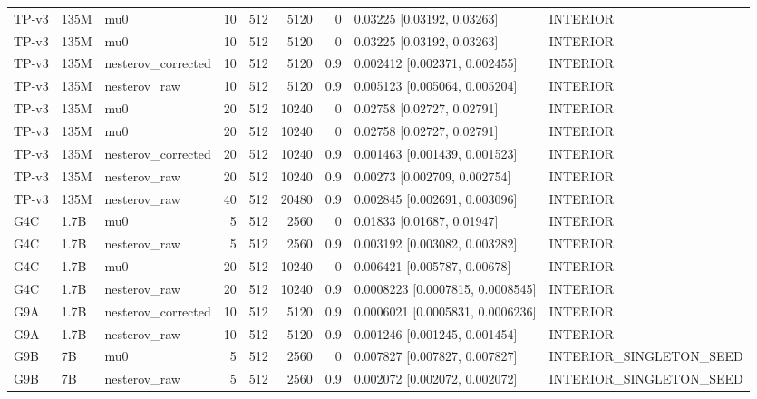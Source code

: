 \begin{longtable}{lllrrrrll}
TP-v3 & 135M & mu0 & 10 & 512 & 5120 & 0 & 0.03225 [0.03192, 0.03263] & INTERIOR \\
TP-v3 & 135M & mu0 & 10 & 512 & 5120 & 0 & 0.03225 [0.03192, 0.03263] & INTERIOR \\
TP-v3 & 135M & nesterov\_corrected & 10 & 512 & 5120 & 0.9 & 0.002412 [0.002371, 0.002455] & INTERIOR \\
TP-v3 & 135M & nesterov\_raw & 10 & 512 & 5120 & 0.9 & 0.005123 [0.005064, 0.005204] & INTERIOR \\
TP-v3 & 135M & mu0 & 20 & 512 & 10240 & 0 & 0.02758 [0.02727, 0.02791] & INTERIOR \\
TP-v3 & 135M & mu0 & 20 & 512 & 10240 & 0 & 0.02758 [0.02727, 0.02791] & INTERIOR \\
TP-v3 & 135M & nesterov\_corrected & 20 & 512 & 10240 & 0.9 & 0.001463 [0.001439, 0.001523] & INTERIOR \\
TP-v3 & 135M & nesterov\_raw & 20 & 512 & 10240 & 0.9 & 0.00273 [0.002709, 0.002754] & INTERIOR \\
TP-v3 & 135M & nesterov\_raw & 40 & 512 & 20480 & 0.9 & 0.002845 [0.002691, 0.003096] & INTERIOR \\
G4C & 1.7B & mu0 & 5 & 512 & 2560 & 0 & 0.01833 [0.01687, 0.01947] & INTERIOR \\
G4C & 1.7B & nesterov\_raw & 5 & 512 & 2560 & 0.9 & 0.003192 [0.003082, 0.003282] & INTERIOR \\
G4C & 1.7B & mu0 & 20 & 512 & 10240 & 0 & 0.006421 [0.005787, 0.00678] & INTERIOR \\
G4C & 1.7B & nesterov\_raw & 20 & 512 & 10240 & 0.9 & 0.0008223 [0.0007815, 0.0008545] & INTERIOR \\
G9A & 1.7B & nesterov\_corrected & 10 & 512 & 5120 & 0.9 & 0.0006021 [0.0005831, 0.0006236] & INTERIOR \\
G9A & 1.7B & nesterov\_raw & 10 & 512 & 5120 & 0.9 & 0.001246 [0.001245, 0.001454] & INTERIOR \\
G9B & 7B & mu0 & 5 & 512 & 2560 & 0 & 0.007827 [0.007827, 0.007827] & INTERIOR\_SINGLETON\_SEED \\
G9B & 7B & nesterov\_raw & 5 & 512 & 2560 & 0.9 & 0.002072 [0.002072, 0.002072] & INTERIOR\_SINGLETON\_SEED \\
\end{longtable}
\endgroup
